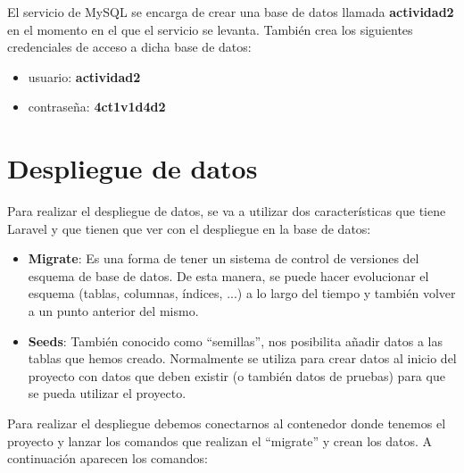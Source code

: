 \documentclass{\ClassPath/viu-tfm-template}
\begin{document}
El servicio de MySQL se encarga de crear una base de datos llamada \textbf{actividad2} en el momento en el que el servicio se levanta. También crea los siguientes credenciales de acceso a dicha base de datos:

\vspace{-1em}
\begin{itemize}
    \item usuario:  \textbf{actividad2}
    \item contraseña:  \textbf{4ct1v1d4d2}
\end{itemize}
\vspace{-1em}

\section{Despliegue de datos}
Para realizar el despliegue de datos, se va a utilizar dos características que tiene Laravel y que tienen que ver con el despliegue en la base de datos:

\vspace{-1em}
\begin{itemize}
    \item \textbf{Migrate}: Es una forma de tener un sistema de control de versiones del esquema de base de datos. De esta manera, se puede hacer evolucionar el esquema (tablas, columnas, índices, ...) a lo largo del tiempo y también volver a un punto anterior del mismo.
    \item \textbf{Seeds}: También conocido como “semillas”, nos posibilita añadir datos a las tablas que hemos creado. Normalmente se utiliza para crear datos al inicio del proyecto con datos que deben existir (o también datos de pruebas) para que se pueda utilizar el proyecto.
\end{itemize}
\vspace{-1em}

Para realizar el despliegue debemos conectarnos al contenedor donde tenemos el proyecto y lanzar los comandos que realizan el “migrate” y crean los datos. A continuación aparecen los comandos:

\end{document}
